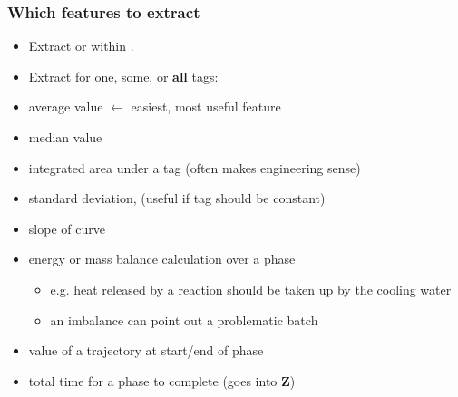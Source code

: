 \begin{frame}\frametitle{Which features to extract}

\begin{itemize}
	\item	Extract {} or within {}. 
	
	\item	Extract for one, some, or \textbf{all} tags:
\end{itemize}\pause

\begin{itemize}
	\item	average value \hfill {\color{myOrange} $\leftarrow$ easiest, most useful feature}
	\item 	median value
	\item	integrated area under a tag (often makes engineering sense)
	\item	standard deviation, (useful if tag should be constant)
	\item	slope of curve\pause
	\item	energy or mass balance calculation over a phase
	 		\begin{itemize}
	 			\item	e.g. heat released by a reaction should be taken up by the cooling water
	 			\item	an imbalance can point out a problematic batch
	 		\end{itemize} \pause
	\item	value of a trajectory at start/end of phase
	\item	total time for a phase to complete (goes into \( \mathbf{Z} \))
\end{itemize}
\end{frame}

